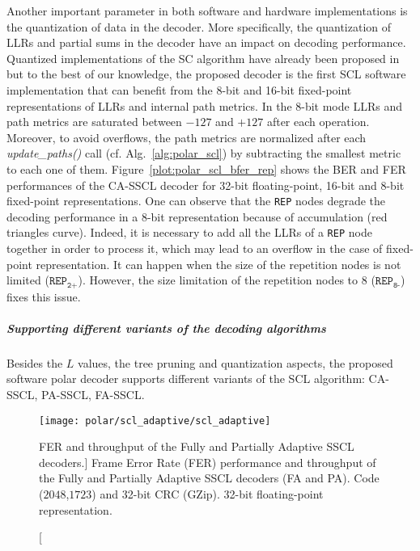 Another important parameter in both software and hardware implementations is the
quantization of data in the decoder. More specifically, the quantization of LLRs
and partial sums in the decoder have an impact on decoding performance.
Quantized implementations of the SC algorithm have already been proposed
in~\cite{Giard2016} but to the best of our knowledge, the proposed decoder is
the first SCL software implementation that can benefit from the 8-bit and 16-bit
fixed-point representations of LLRs and internal path metrics. In the 8-bit mode
LLRs and path metrics are saturated between $-127$ and $+127$ after each
operation. Moreover, to avoid overflows, the path metrics are normalized after
each \textit{update\_paths()} call (cf. Alg.~\ref{alg:polar_scl}) by subtracting
the smallest metric to each one of them. Figure~\ref{plot:polar_scl_bfer_rep}
shows the BER and FER performances of the CA-SSCL decoder for 32-bit
floating-point, 16-bit and 8-bit fixed-point representations. One can observe
that the \verb|REP| nodes degrade the decoding performance in a 8-bit
representation because of accumulation (red triangles curve). Indeed, it is
necessary to add all the LLRs of a \verb|REP| node together in order to process
it, which may lead to an overflow in the case of fixed-point representation. It
can happen when the size of the repetition nodes is not limited
($\texttt{REP}_\texttt{2+}$). However, the size limitation of the repetition
nodes to 8 ($\texttt{REP}_\texttt{8-}$) fixes this issue.

\subparagraph{Supporting different variants of the decoding algorithms}

Besides the $L$ values, the tree pruning and quantization aspects, the proposed
software polar decoder supports different variants of the SCL algorithm:
CA-SSCL, PA-SSCL, FA-SSCL.

\begin{figure}[htp]
  \centering
  \texttt{[image: polar/scl\_adaptive/scl\_adaptive]}
  \caption
    [FER and throughput of the Fully and Partially Adaptive SSCL decoders.]
    {Frame Error Rate (FER) performance and throughput of the Fully and
    Partially Adaptive SSCL decoders (FA and PA). Code ($2048$,$1723$) and
    32-bit CRC (GZip). 32-bit floating-point representation.}
  \label{plot:polar_scl_adaptive}
\end{figure}

